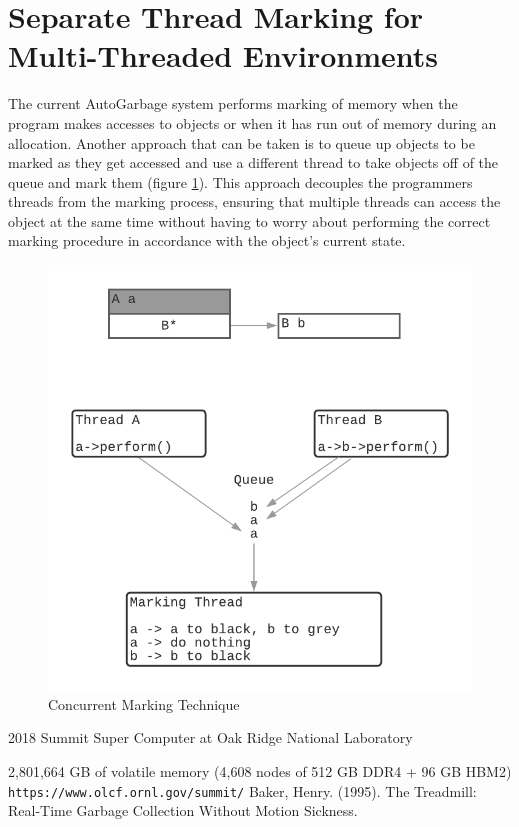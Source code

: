 \documentclass[11pt]{article}
\begin{document}
\section{Separate Thread Marking for Multi-Threaded Environments}
\label{app:multithreadedmarking}
The current AutoGarbage system performs marking of memory when the program makes accesses to objects
or when it has run out of memory during an allocation. Another approach that can be taken is to 
queue up objects to be marked as they get accessed and use a different thread to take objects off of the queue
and mark them (figure \ref{fig:concurrentmarking}). This approach decouples the programmers threads from the marking process, ensuring that multiple threads
can access the object at the same time without having to worry about performing the correct marking
procedure in accordance with the object's current state.
\begin{figure}
\begin{center}
\includegraphics[scale=0.5]{./report_srcs/concurrent_marking.png}
\caption{Concurrent Marking Technique}
\label{fig:concurrentmarking}
\end{center}
\end{figure}

\newpage
\begin{thebibliography}{9}
2018 Summit Super Computer at Oak Ridge National Laboratory

2,801,664 GB of volatile memory (4,608 nodes of 512 GB DDR4 + 96 GB HBM2)
\texttt{https://www.olcf.ornl.gov/summit/}
Baker, Henry. (1995). The Treadmill: Real-Time Garbage Collection Without Motion Sickness. 


\end{thebibliography}
\end{document}
